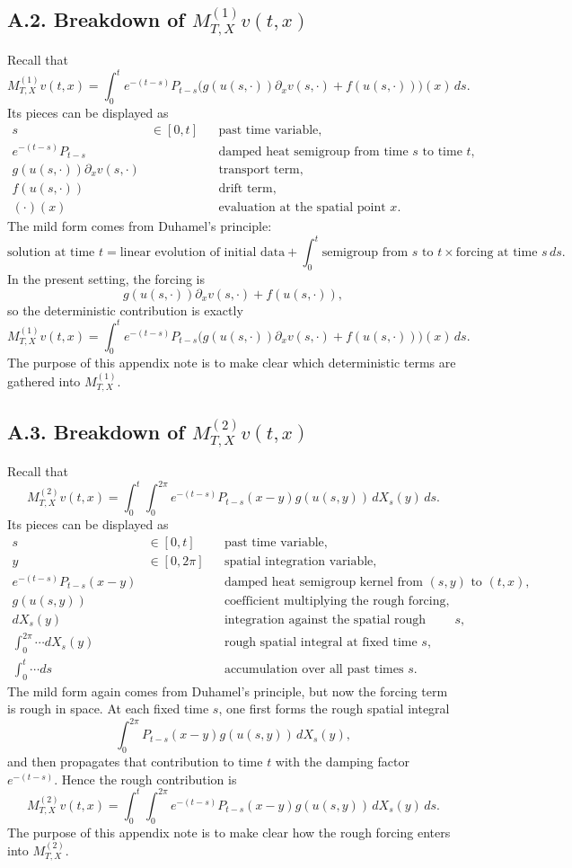 \documentclass[11pt]{article}
\theoremstyle{definition}
\theoremstyle{remark}
\begin{document}
\subsection*{A.2. Breakdown of $M_{T,X}^{(1)}v(t,x)$}
Recall that
\[
M_{T,X}^{(1)}v(t,x)=\int_0^t e^{-(t-s)}P_{t-s}\bigl(g(u(s,\cdot))\partial_x v(s,\cdot)+f(u(s,\cdot))\bigr)(x)\,ds.
\]
Its pieces can be displayed as
\[
\begin{aligned}
s &\in [0,t] && \text{past time variable},\\
e^{-(t-s)}P_{t-s} &&& \text{damped heat semigroup from time } s \text{ to time } t,\\
g(u(s,\cdot))\partial_x v(s,\cdot) &&& \text{transport term},\\
f(u(s,\cdot)) &&& \text{drift term},\\
(\cdot)(x) &&& \text{evaluation at the spatial point } x.
\end{aligned}
\]
The mild form comes from Duhamel's principle:
\[
\text{solution at time } t
=
\text{linear evolution of initial data}
+
\int_0^t
\text{semigroup from } s \text{ to } t
\times
\text{forcing at time } s
\,ds.
\]
In the present setting, the forcing is
\[
g(u(s,\cdot))\partial_x v(s,\cdot)+f(u(s,\cdot)),
\]
so the deterministic contribution is exactly
\[
M_{T,X}^{(1)}v(t,x)
=
\int_0^t
e^{-(t-s)}P_{t-s}
\bigl(g(u(s,\cdot))\partial_x v(s,\cdot)+f(u(s,\cdot))\bigr)(x)\,ds.
\]
The purpose of this appendix note is to make clear which deterministic terms are gathered into $M_{T,X}^{(1)}$.

\subsection*{A.3. Breakdown of $M_{T,X}^{(2)}v(t,x)$}
Recall that
\[
M_{T,X}^{(2)}v(t,x)=\int_0^t\int_0^{2\pi} e^{-(t-s)}P_{t-s}(x-y)g(u(s,y))\,dX_s(y)\,ds.
\]
Its pieces can be displayed as
\[
\begin{aligned}
s &\in [0,t] && \text{past time variable},\\
y &\in [0,2\pi] && \text{spatial integration variable},\\
e^{-(t-s)}P_{t-s}(x-y) &&& \text{damped heat semigroup kernel from } (s,y) \text{ to } (t,x),\\
g(u(s,y)) &&& \text{coefficient multiplying the rough forcing},\\
dX_s(y) &&& \text{integration against the spatial rough signal at time } s,\\
\int_0^{2\pi}\cdots dX_s(y) &&& \text{rough spatial integral at fixed time } s,\\
\int_0^t \cdots ds &&& \text{accumulation over all past times } s.
\end{aligned}
\]
The mild form again comes from Duhamel's principle, but now the forcing term is rough in space. At each fixed time $s$, one first forms the rough spatial integral
\[
\int_0^{2\pi} P_{t-s}(x-y)g(u(s,y))\,dX_s(y),
\]
and then propagates that contribution to time $t$ with the damping factor $e^{-(t-s)}$. Hence the rough contribution is
\[
M_{T,X}^{(2)}v(t,x)
=
\int_0^t
\int_0^{2\pi}
e^{-(t-s)}P_{t-s}(x-y)g(u(s,y))\,dX_s(y)\,ds.
\]
The purpose of this appendix note is to make clear how the rough forcing enters into $M_{T,X}^{(2)}$.
\end{document}
